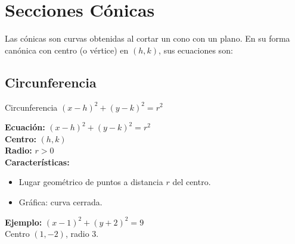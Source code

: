 \documentclass[12pt,a4paper]{article}
\begin{document}
\newpage
\section{Secciones Cónicas}

Las cónicas son curvas obtenidas al cortar un cono con un plano. En su forma canónica con centro (o vértice) en $(h,k)$, sus ecuaciones son:

\subsection{Circunferencia}
\begin{funcbox}{Circunferencia $(x-h)^2+(y-k)^2=r^2$}
\begin{minipage}[t]{0.55\textwidth}
    \textbf{Ecuación:} $(x-h)^2+(y-k)^2=r^2$\\
    \textbf{Centro:} $(h,k)$\\
    \textbf{Radio:} $r>0$\\
    \textbf{Características:}
    \begin{itemize}
        \item Lugar geométrico de puntos a distancia $r$ del centro.
        \item Gráfica: curva cerrada.
    \end{itemize}
    \textbf{Ejemplo:} $(x-1)^2+(y+2)^2=9$ \\ Centro $(1,-2)$, radio $3$.
\end{minipage}\hfill
\begin{minipage}[t]{0.4\textwidth}
    \centering
\end{minipage}
\end{funcbox}
\end{document}
